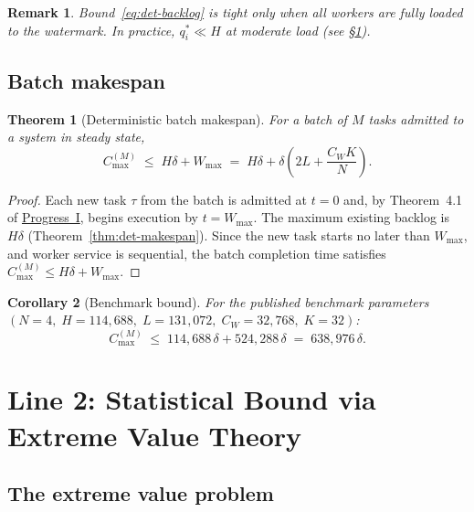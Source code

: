 \documentclass[11pt,a4paper]{article}
\newtheorem{theorem}{Theorem}[section]
\newtheorem{corollary}[theorem]{Corollary}
\newtheorem{remark}{Remark}[section]
\newcommand{\Wmax}{W_{\max}}
\newcommand{\Cmax}{C_{\max}}
\begin{document}
\begin{remark}
Bound~\eqref{eq:det-backlog} is tight only when all workers are fully
loaded to the watermark.  In practice, $q_i^* \ll H$ at moderate load
(see \S{}\ref{sec:stat}).
\end{remark}

\subsection{Batch makespan}

\begin{theorem}[Deterministic batch makespan]
\label{thm:det-batch}
For a batch of $M$ tasks admitted to a system in steady state,
\begin{equation}
  \Cmax^{(M)}
  \;\leq\;
  H\delta + \Wmax
  \;=\;
  H\delta + \delta\!\left(2L + \frac{C_W K}{N}\right).
  \label{eq:det-batch}
\end{equation}
\end{theorem}

\begin{proof}
Each new task $\tau$ from the batch is admitted at $t=0$ and, by
Theorem~4.1 of \hyperref[chap:bounded_wait]{Progress~I}, begins execution by
$t = \Wmax$.
The maximum existing backlog is $H\delta$ (Theorem~\ref{thm:det-makespan}).
Since the new task starts no later than $\Wmax$, and worker service is
sequential, the batch completion time satisfies
$\Cmax^{(M)} \leq H\delta + \Wmax$.
\end{proof}

\begin{corollary}[Benchmark bound]
\label{cor:det-benchmark}
For the published benchmark parameters
$(N=4,\; H=114{,}688,\; L=131{,}072,\; C_W=32{,}768,\; K=32)$:
\[
  \Cmax^{(M)} \;\leq\; 114{,}688\,\delta + 524{,}288\,\delta
  \;=\; 638{,}976\,\delta.
\]
\end{corollary}

\section{Line 2: Statistical Bound via Extreme Value Theory~\cite{leadbetter1983,fisher_tippett1928,gumbel1958}}
\label{sec:stat}

\subsection{The extreme value problem}
\end{document}
